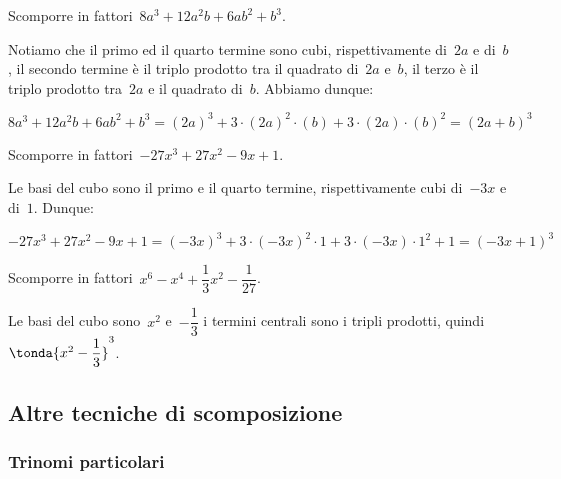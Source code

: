 \begin{esempio}{}{}
Scomporre in fattori~\(8a^{3}+12a^{2}b+6{ab}^{2}+b^{3}\).

Notiamo che il primo ed il quarto termine sono cubi, rispettivamente 
di~\(2a\) e di~\(b\), 
il secondo termine è il triplo prodotto tra il quadrato di~\(2a\) e~\(b\), 
il terzo è il triplo prodotto tra~\(2a\) e il quadrato di~\(b\).
Abbiamo dunque:

\vspace{-1.5em}
\[8a^{3}+12a^{2}b+6ab^{2}+b^{3}=
  (2a)^{3}+3\cdot (2a)^{2}\cdot (b)+3\cdot (2a)\cdot (b)^{2}=(2a+b)^{3}\]
\end{esempio}

\begin{esempio}{}{}
Scomporre in fattori~\(-27x^3+27x^2-9x+1\).

Le basi del cubo sono il primo e il quarto termine, rispettivamente cubi 
di~\(-3x\) e di~\(1\).
Dunque:

\vspace{-1.5em}
\[-27x^3+27x^2-9x+1=
  (-3x)^{3}+3\cdot (-3x)^{2}\cdot 1+3\cdot (-3x)\cdot 1^{2}+1=(-3x+1)^{3}\]
\end{esempio}

\begin{esempio}{}{}
Scomporre in fattori~\(x^6-x^4+\dfrac{1}{3}x^2-\dfrac{1}{27}\).

Le basi del cubo sono~\(x^2\) e~\(-\dfrac{1}{3}\) i termini centrali sono i 
tripli prodotti, quindi~\(\tonda{x^2-\dfrac{1}{3}}^{3}\).
\end{esempio}





\subsection{Altre tecniche di scomposizione}
\label{subsec:divpol_altretecniche}

\subsubsection{Trinomi particolari}
\label{subsubsec:trinpart}

